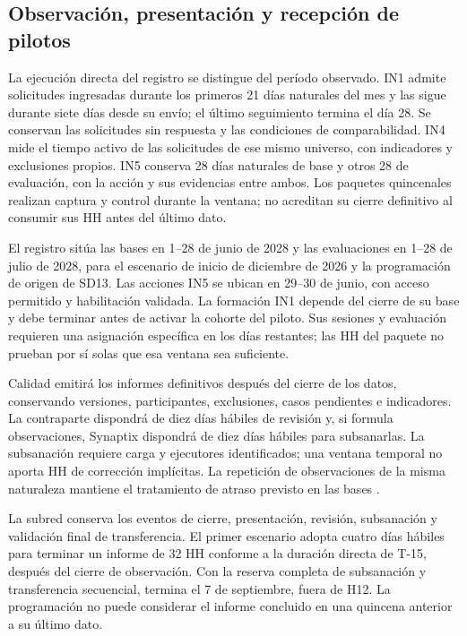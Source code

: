 \subsection{Observación, presentación y recepción de pilotos}
La ejecución directa del registro se distingue del período observado. IN1 admite solicitudes ingresadas durante los primeros 21 días naturales del mes y las sigue durante siete días desde su envío; el último seguimiento termina el día 28. Se conservan las solicitudes sin respuesta y las condiciones de comparabilidad. IN4 mide el tiempo activo de las solicitudes de ese mismo universo, con indicadores y exclusiones propios. IN5 conserva 28 días naturales de base y otros 28 de evaluación, con la acción y sus evidencias entre ambos. Los paquetes quincenales realizan captura y control durante la ventana; no acreditan su cierre definitivo al consumir sus HH antes del último dato.

El registro  sitúa las bases en 1--28 de junio de 2028 y las evaluaciones en 1--28 de julio de 2028, para el escenario de inicio de diciembre de 2026 y la programación de origen de SD13. Las acciones IN5 se ubican en 29--30 de junio, con acceso permitido y habilitación validada. La formación IN1 depende del cierre de su base y debe terminar antes de activar la cohorte del piloto. Sus sesiones y evaluación requieren una asignación específica en los días restantes; las HH del paquete no prueban por sí solas que esa ventana sea suficiente.

Calidad emitirá los informes definitivos después del cierre de los datos, conservando versiones, participantes, exclusiones, casos pendientes e indicadores. La contraparte dispondrá de diez días hábiles de revisión y, si formula observaciones, Synaptix dispondrá de diez días hábiles para subsanarlas. La subsanación requiere carga y ejecutores identificados; una ventana temporal no aporta HH de corrección implícitas. La repetición de observaciones de la misma naturaleza mantiene el tratamiento de atraso previsto en las bases \parencite[art.~18.2--18.4; p.~13]{bases-admin}.



La subred  conserva los eventos de cierre, presentación, revisión, subsanación y validación final de transferencia. El primer escenario adopta cuatro días hábiles para terminar un informe de 32 HH conforme a la duración directa de T-15, después del cierre de observación. Con la reserva completa de subsanación y transferencia secuencial, termina el 7 de septiembre, fuera de H12. La programación no puede considerar el informe concluido en una quincena anterior a su último dato.

